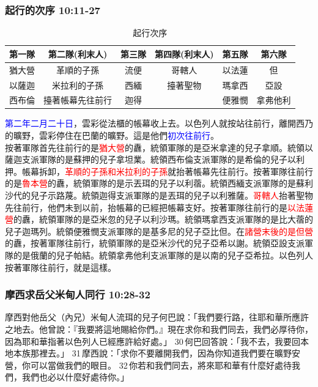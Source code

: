 \subsubsection{起行的次序 10:11-27}
\noindent
\begin{table}
\begin{tabular}{|c|c|c|c|c|c|}
\hline
\hline
第一隊  & 第二隊(利末人)&  第三隊 &第四隊(利末人) &第五隊&第六隊 \\\hline
猶大營 & 革順的子孫    &流便 &哥轄人 & 以法蓮& 但 \\
以薩迦  & 米拉利的子孫  & 西緬 &擡著聖物  & 瑪拿西& 亞設\\
西布倫 & 擡著帳幕先往前行  &迦得&   & 便雅憫& 拿弗他利 \\
\hline
\end{tabular}
\caption{起行次序}
\end{table}
\textcolor{blue}{第二年二月二十日}，雲彩從法櫃的帳幕收上去。以色列人就按站往前行，離開西乃的曠野，雲彩停住在巴蘭的曠野。這是他們\textcolor{blue}{初次往前行}。 \\
按著軍隊首先往前行的是\textcolor{red}{猶大營}的纛，統領軍隊的是亞米拿達的兒子拿順。統領以薩迦支派軍隊的是蘇押的兒子拿坦業。統領西布倫支派軍隊的是希倫的兒子以利押。帳幕拆卸，\textcolor{red}{革順的子孫和米拉利的子孫}就抬著帳幕先往前行。按著軍隊往前行的是\textcolor{red}{魯本營}的纛，統領軍隊的是示丟珥的兒子以利蓿。統領西緬支派軍隊的是蘇利沙代的兒子示路蔑。統領迦得支派軍隊的是丟珥的兒子以利雅薩。\textcolor{red}{哥轄人}抬著聖物先往前行，他們未到以前，抬帳幕的已經把帳幕支好。按著軍隊往前行的是\textcolor{red}{以法蓮營}的纛，統領軍隊的是亞米忽的兒子以利沙瑪。統領瑪拿西支派軍隊的是比大蓿的兒子迦瑪列。統領便雅憫支派軍隊的是基多尼的兒子亞比但。在\textcolor{red}{諸營末後的是但營}的纛，按著軍隊往前行，統領軍隊的是亞米沙代的兒子亞希以謝。統領亞設支派軍隊的是俄蘭的兒子帕結。統領拿弗他利支派軍隊的是以南的兒子亞希拉。以色列人按著軍隊往前行，就是這樣。

\subsubsection{摩西求岳父米甸人同行 10:28-32}
摩西對他岳父（內兄）米甸人流珥的兒子何巴說：「我們要行路，往耶和華所應許之地去。他曾說：『我要將這地賜給你們。』現在求你和我們同去，我們必厚待你，因為耶和華指著以色列人已經應許給好處。」 30 何巴回答說：「我不去，我要回本地本族那裡去。」 31 摩西說：「求你不要離開我們，因為你知道我們要在曠野安營，你可以當做我們的眼目。 32 你若和我們同去，將來耶和華有什麼好處待我們，我們也必以什麼好處待你。」

